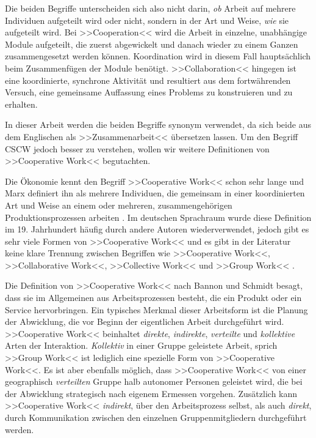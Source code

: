 	\medskip Die beiden Begriffe unterscheiden sich also nicht darin, \emph{ob} Arbeit auf mehrere Individuen aufgeteilt wird oder nicht, sondern in der Art und Weise, \emph{wie} sie aufgeteilt wird. Bei >>Cooperation<< wird die Arbeit in einzelne, unabhängige Module aufgeteilt, die zuerst abgewickelt und danach wieder zu einem Ganzen zusammengesetzt werden können. Koordination wird in diesem Fall hauptsächlich beim Zusammenfügen der Module benötigt. >>Collaboration<< hingegen ist eine koordinierte, synchrone Aktivität und resultiert aus dem fortwährenden Versuch, eine gemeinsame Auffassung eines Problems zu konstruieren und zu erhalten.
	
	In dieser Arbeit werden die beiden Begriffe synonym verwendet, da sich beide aus dem Englischen als >>Zusammenarbeit<< übersetzen lassen. Um den Begriff CSCW jedoch besser zu verstehen, wollen wir weitere Definitionen von >>Cooperative Work<< begutachten.
	
	Die Ökonomie kennt den Begriff >>Cooperative Work<< schon sehr lange und Marx definiert ihn als mehrere Individuen, die gemeinsam in einer koordinierten Art und Weise an einem oder mehreren, zusammengehörigen Produktionsprozessen arbeiten \citep{Marx:1867}. Im deutschen Sprachraum wurde diese Definition im 19. Jahrhundert häufig durch andere Autoren wiederverwendet, jedoch gibt es sehr viele Formen von >>Cooperative Work<< und es gibt in der Literatur keine klare Trennung zwischen Begriffen wie >>Cooperative Work<<, >>Collaborative Work<<, >>Collective Work<< und >>Group Work<< \citep{Bannon:1990p244}.
	
	Die Definition von >>Cooperative Work<< nach Bannon und Schmidt besagt, dass sie im Allgemeinen aus Arbeitsprozessen besteht, die ein Produkt oder ein Service hervorbringen. Ein typisches Merkmal dieser Arbeitsform ist die Planung der Abwicklung, die vor Beginn der eigentlichen Arbeit durchgeführt wird. >>Cooperative Work<< beinhaltet \emph{direkte}, \emph{indirekte}, \emph{verteilte} und \emph{kollektive} Arten der Interaktion. \emph{Kollektiv} in einer Gruppe geleistete Arbeit, sprich >>Group Work<< ist lediglich eine spezielle Form von >>Cooperative Work<<. Es ist aber ebenfalls möglich, dass >>Cooperative Work<< von einer geographisch \emph{verteilten} Gruppe halb autonomer Personen geleistet wird, die bei der Abwicklung strategisch nach eigenem Ermessen vorgehen. Zusätzlich kann >>Cooperative Work<< \emph{indirekt}, über den Arbeitsprozess selbst, als auch \emph{direkt}, durch Kommunikation zwischen den einzelnen Gruppenmitgliedern durchgeführt werden. \citep{Bannon:1990p244}
	
